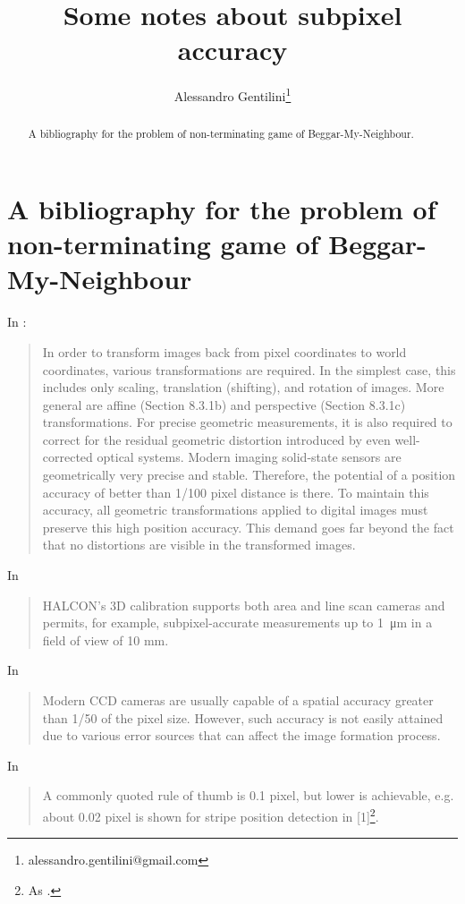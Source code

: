 \documentclass[a4paper,12pt]{article}
\title{Some notes about subpixel accuracy}
\author{Alessandro Gentilini\thanks{alessandro.gentilini@gmail.com}}
\begin{document}
\maketitle

\begin{abstract}
A bibliography for the problem of non-terminating game of Beggar-My-Neighbour.
\end{abstract} 

\section{A bibliography for the problem of non-terminating game of 
Beggar-My-Neighbour}

In \cite[section 8.2, p.270]{Jahne:2004:PHI:983100}:
\begin{quotation}
In order to transform images back from pixel coordinates to world coordinates,
various transformations are required. In the simplest case, this
includes only scaling,
translation (shifting), and rotation of images. More general are
affine (Section 8.3.1b)
and perspective (Section 8.3.1c) transformations. For precise
geometric measurements,
it is also required to correct for the residual geometric distortion
introduced by even
well-corrected optical systems. Modern imaging solid-state sensors are
geometrically
very precise and stable. Therefore, the potential of a position
accuracy of better than
1/100 pixel distance is there. To maintain this accuracy, all
geometric transformations
applied to digital images must preserve this high position accuracy.
This demand goes
far beyond the fact that no distortions are visible in the transformed images.
\end{quotation}

In \cite{halcon}
\begin{quotation}
HALCON’s 3D calibration supports both area and line scan cameras and
permits, for example, subpixel-accurate measurements up to \SI{1}{\micro\metre} in a field of
view of 10 mm.
\end{quotation}

In \cite{Heikkila:2000:GCC:354167.354171}
\begin{quotation}
Modern CCD cameras are usually capable of a spatial accuracy greater than 1/50 of the pixel
size. However, such accuracy is not easily attained due to various error sources that can affect
the image formation process.
\end{quotation}

In \cite{Fisher}
\begin{quotation}
A commonly quoted rule of thumb is 0.1 pixel, but lower is achievable, e.g. about 0.02 pixel is shown for stripe position detection in [1]\footnote{As \cite{doi:10.1117/12.55947}.}.
\end{quotation}

\printbibliography
\end{document}
